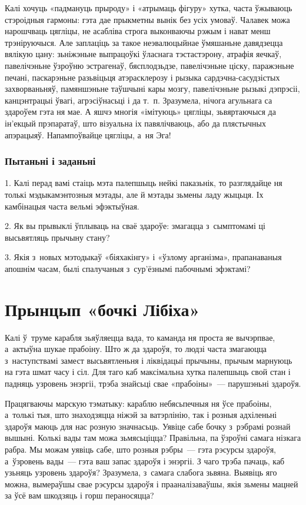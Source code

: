 Калі хочуць «падмануць прыроду» і «атрымаць фігуру» хутка, часта ўжываюць стэроідныя гармоны: гэта дае прыкметны вынік без усіх умоваў. Чалавек можа нарошчваць цягліцы, не асабліва строга выконваючы рэжым і нават менш трэніруючыся. Але заплаціць за такое неэвалюцыйнае ўмяшаньне давядзецца вялікую цану: зьніжэньне выпрацоўкі ўласнага тэстастэрону, атрафія яечкаў, павелічэньне ўзроўню эстрагенаў, бясплодзьдзе, павелічэньне ціску, паражэньне печані, паскарэньне разьвіцьця атэрасклерозу і рызыка сардэчна-сасудзістых захворваньняў, памяншэньне таўшчыні кары мозгу, павелічэньне рызыкі дэпрэсіі, канцэнтрацыі ўвагі, агрэсіўнасьці і да т.~п. Зразумела, нічога агульнага са здароўем гэта ня мае. А яшчэ многія «імітуюць» цягліцы, зьвяртаючыся да ін'екцый прэпаратаў, што візуальна іх павялічваюць, або да плястычных апэрацыяў. Напампоўвайце цягліцы, а~ня Эга!

\subsubsection{Пытаньні і заданьні}

1. Калі перад вамі стаіць мэта палепшыць нейкі паказьнік, то разглядайце ня толькі мэдыкамэнтозныя мэтады, але й мэтады зьмены ладу жыцьця. Іх камбінацыя часта вельмі эфэктыўная.

2. Як вы прывыклі ўплываць на сваё здароўе: змагацца з~сымптомамі ці высьвятляць прычыну стану?

3. Якія з~новых мэтодыкаў «біяхакінгу» і «ўзлому арганізма», прапанаваныя апошнім часам, былі спалучаныя з~сур'ёзнымі пабочнымі эфэктамі?


\section{Прынцып «бочкі Лібіха»}

Калі ў~труме карабля зьяўляецца вада, то каманда ня проста яе вычэрпвае, а~актыўна шукае прабоіну. Што ж да здароўя, то людзі часта змагаюцца з~наступствамі замест высьвятленьня і ліквідацыі прычыны, прычым марнуюць на гэта шмат часу і сіл. Для таго каб максімальна хутка палепшыць свой стан і падняць узровень энэргіі, трэба знайсьці свае «прабоіны»~--- парушэньні здароўя.

Працягваючы марскую тэматыку: караблю небясьпечныя ня ўсе прабоіны, а~толькі тыя, што знаходзяцца ніжэй за ватэрлінію, так і розныя адхіленьні здароўя маюць для нас розную значнасьць. Уявіце сабе бочку з~рэбрамі рознай вышыні. Колькі вады там можа зьмясьціцца? Правільна, па ўзроўні самага нізкага рабра. Мы можам уявіць сабе, што розныя рэбры~--- гэта рэсурсы здароўя, а~ўзровень вады~--- гэта ваш запас здароўя і энэргіі. З чаго трэба пачаць, каб узьняць узровень здароўя? Зразумела, з~самага слабога зьвяна. Выявіць яго можна, вымераўшы свае рэсурсы здароўя і прааналізаваўшы, якія зьмены мацней за ўсё вам шкодзяць і горш пераносяцца?

